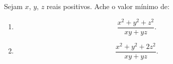 Sejam $ x$, $ y$, $ z$ reais positivos. Ache o valor mínimo de:

\begin{enumerate}[label = (\alph*)]
	\item \[ \frac{x^2 + y^2 + z^2}{xy + yz}. \]
	\item \[ \frac{x^2 + y^2 + 2z^2}{xy + yz}. \]
\end{enumerate}
